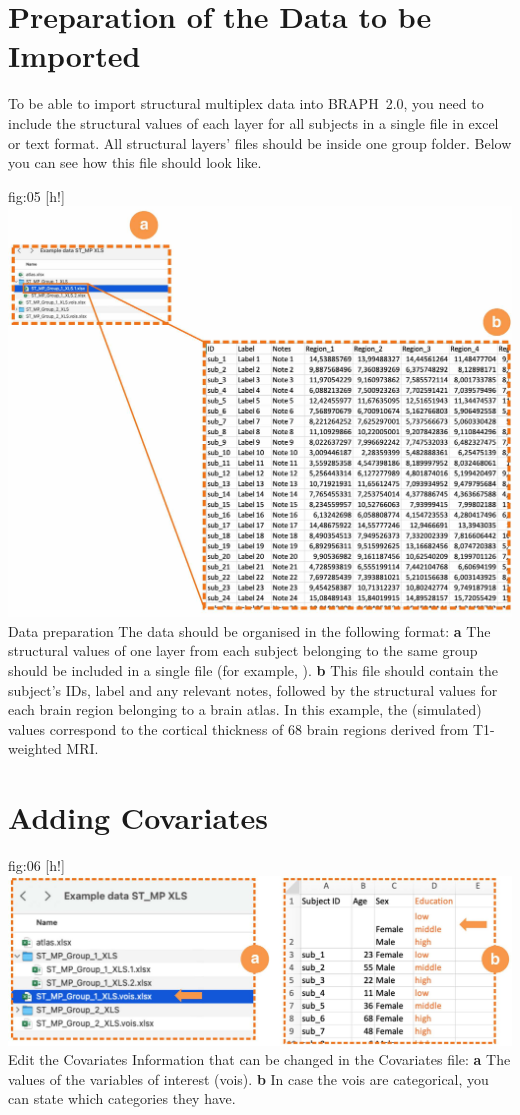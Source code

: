 \documentclass[justified]{tufte-handout}
\begin{document}
\clearpage
\section{Preparation of the Data to be Imported}

To be able to import structural multiplex data into BRAPH~2.0, you need to include the structural values of each layer for all subjects in a single file in excel or text format. All structural layers' files should be inside one group folder. Below you can see how this file should look like.

	{fig:05}
	{
	[h!]
	\includegraphics{fig05.jpg}
	}
	{Data preparation}
	{
	The data should be organised in the following format:
	{\bf a} The structural values of one layer from each subject belonging to the same group should be included in a single file (for example, ). 
	{\bf b} This file should contain the subject's IDs, label and any relevant notes, followed by the structural values for each brain region belonging to a brain atlas. In this example, the (simulated) values correspond to the cortical thickness of 68 brain regions derived from T1-weighted MRI.
	} 

\section{Adding Covariates}

	{fig:06}
	{
	[h!]
	\includegraphics{fig06.jpg}
	}
	{Edit the Covariates}
	{
	Information that can be changed in the Covariates file: 
	{\bf a} The values of the variables of interest (vois).
	{\bf b} In case the vois are categorical, you can state which categories they have.
	}
	
\end{document}
